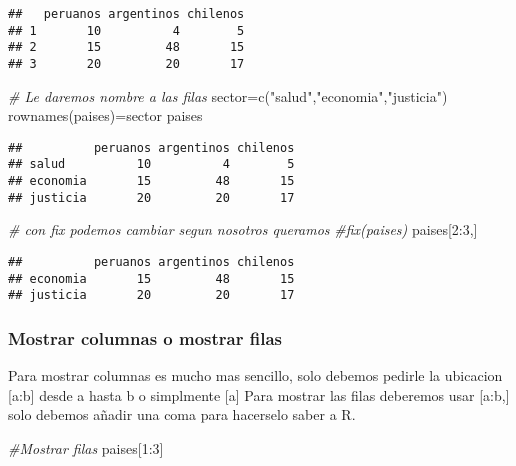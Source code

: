 \documentclass[
]{article}
\newenvironment{Shaded}{\begin{snugshade}}{\end{snugshade}}
\newcommand{\CommentTok}[1]{\textcolor[rgb]{0.56,0.35,0.01}{\textit{#1}}}
\newcommand{\DecValTok}[1]{\textcolor[rgb]{0.00,0.00,0.81}{#1}}
\newcommand{\FunctionTok}[1]{\textcolor[rgb]{0.00,0.00,0.00}{#1}}
\newcommand{\NormalTok}[1]{#1}
\newcommand{\OtherTok}[1]{\textcolor[rgb]{0.56,0.35,0.01}{#1}}
\newcommand{\SpecialCharTok}[1]{\textcolor[rgb]{0.00,0.00,0.00}{#1}}
\newcommand{\StringTok}[1]{\textcolor[rgb]{0.31,0.60,0.02}{#1}}
\begin{document}
\begin{verbatim}
##   peruanos argentinos chilenos
## 1       10          4        5
## 2       15         48       15
## 3       20         20       17
\end{verbatim}

\begin{Shaded}
\begin{Highlighting}[]
\CommentTok{\# Le daremos nombre a las filas}
\NormalTok{sector}\OtherTok{=}\FunctionTok{c}\NormalTok{(}\StringTok{"salud"}\NormalTok{,}\StringTok{"economia"}\NormalTok{,}\StringTok{"justicia"}\NormalTok{)}
\FunctionTok{rownames}\NormalTok{(paises)}\OtherTok{=}\NormalTok{sector}
\NormalTok{paises}
\end{Highlighting}
\end{Shaded}

\begin{verbatim}
##          peruanos argentinos chilenos
## salud          10          4        5
## economia       15         48       15
## justicia       20         20       17
\end{verbatim}

\begin{Shaded}
\begin{Highlighting}[]
\CommentTok{\# con fix podemos cambiar segun nosotros queramos}
\CommentTok{\#fix(paises)}
\NormalTok{paises[}\DecValTok{2}\SpecialCharTok{:}\DecValTok{3}\NormalTok{,]}
\end{Highlighting}
\end{Shaded}

\begin{verbatim}
##          peruanos argentinos chilenos
## economia       15         48       15
## justicia       20         20       17
\end{verbatim}

\hypertarget{mostrar-columnas-o-mostrar-filas}{%
\subsubsection{Mostrar columnas o mostrar
filas}\label{mostrar-columnas-o-mostrar-filas}}

Para mostrar columnas es mucho mas sencillo, solo debemos pedirle la
ubicacion {[}a:b{]} desde a hasta b o simplmente {[}a{]} Para mostrar
las filas deberemos usar {[}a:b,{]} solo debemos añadir una coma para
hacerselo saber a R.

\begin{Shaded}
\begin{Highlighting}[]
\CommentTok{\#Mostrar filas}
\NormalTok{paises[}\DecValTok{1}\SpecialCharTok{:}\DecValTok{3}\NormalTok{]}
\end{Highlighting}
\end{Shaded}
\end{document}
